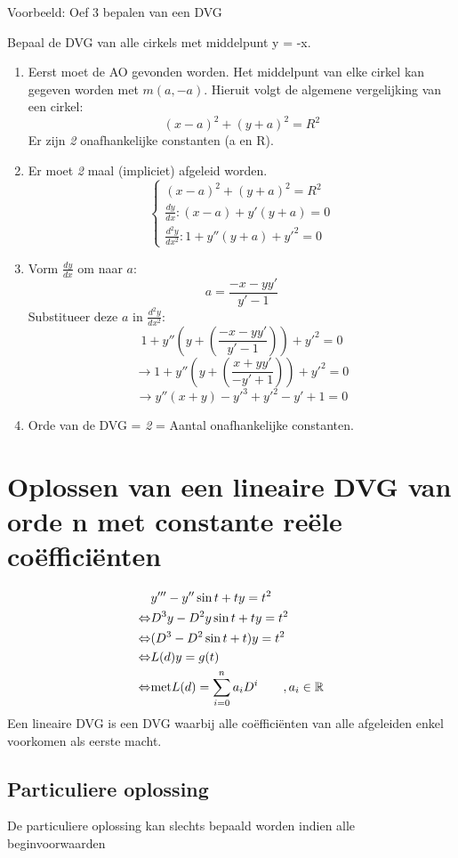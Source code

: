 \documentclass[12pt]{report}
\newcommand{\example}[2]{
    \hrulefill
    
    Voorbeeld: #1
    
    #2
    
    \hrulefill
}
\begin{document}
\example{Oef 3 bepalen van een DVG}
{
Bepaal de DVG van alle cirkels met middelpunt y = -x.
\begin{enumerate}
\item Eerst moet de AO gevonden worden. Het middelpunt van elke cirkel kan gegeven worden met $m(a, -a).$
    Hieruit volgt de algemene vergelijking van een cirkel: $$(x - a)^2 + (y + a)^2 = R^2$$
    Er zijn \textit{2} onafhankelijke constanten (a en R).
\item Er moet \textit{2} maal (impliciet) afgeleid worden.
\[
    \begin{cases}
    (x - a)^2 + (y + a)^2 = R^2 \\
    \frac{dy}{dx} : (x-a) + y'(y+a) = 0 \\
    \frac{d^2y}{dx^2} : 1 + y''(y + a) + y'^2 = 0
    \end{cases}
\]
\item
    Vorm $\frac{dy}{dx}$ om naar $a$:
    $$a = \frac{-x - yy'}{y' - 1}$$
    Substitueer deze $a$ in $\frac{d^2y}{dx^2}$:
    $$1 + y''(y + (\frac{-x - yy'}{y' - 1})) + y'^2 = 0$$
    $$\rightarrow 1 + y''(y + (\frac{x + yy'}{-y' + 1})) + y'^2 = 0$$
    $$\rightarrow y''(x + y) - y'^3 + y'^2 - y' + 1 = 0$$
\item Orde van de DVG = \textit{2}  = Aantal onafhankelijke constanten.
\end{enumerate}
}
\section{Oplossen van een lineaire DVG van orde n met constante reële coëfficiënten}
\begin{equation*}
 \begin{split}
		  & y''' - y''\sin t + ty = t^2 \\
  \Leftrightarrow & D^3y - D^2y\sin t + ty = t^2 \\
  \Leftrightarrow & (D^3 - D^2\sin t + t)y = t^2 \\
  \Leftrightarrow & L(d)y = g(t) \\
  \Leftrightarrow & \hbox{met} L(d) = \sum_{i = 0}^{n} a_iD^i \qquad ,a_i \in \mathbb{R}
 \end{split}
\end{equation*}
Een lineaire DVG is een DVG waarbij alle coëfficiënten van alle afgeleiden enkel voorkomen als eerste macht.
\subsection{Particuliere oplossing}
De particuliere oplossing kan slechts bepaald worden indien alle beginvoorwaarden 
\end{document}
